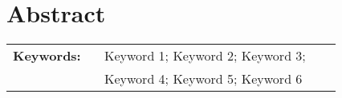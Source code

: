 \chapter*{Abstract}


\lipsum[1-2]

%
\vfill
%
{\centering %
\begin{tabular}{p{0.25\linewidth} p{0.65\linewidth}}
	\textbf{\Large Keywords:} 	& Keyword 1; Keyword 2; Keyword 3; \\ %
								& Keyword 4; Keyword 5; Keyword 6    %
\end{tabular}
}